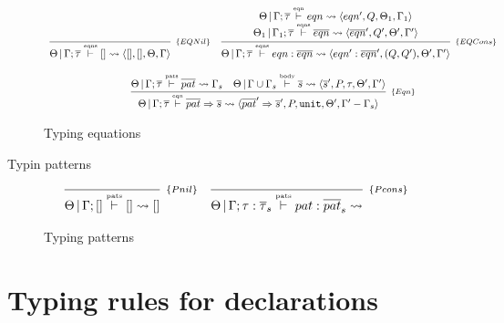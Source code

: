 \documentclass[a4paper, 11pt]{article}
\begin{document}
\begin{figure}[H]
  \[
    \begin{array}{cc}
      \infer[_{\{EQNil\}}]
      {\Theta \,|\, \Gamma ; \overline{\tau} \typing{eqns} [] \leadsto \langle [], [], \Theta, \Gamma \rangle}
            {}
      &
      \infer[_{\{EQCons\}}]
      {\Theta\,|\,\Gamma ; \overline{\tau}\typing{eqns} eqn : \overline{eqn} \leadsto \langle eqn' : \overline{eqn}', (Q, Q'), \Theta', \Gamma' \rangle}
            {\begin{array}{c}
                \Theta\,|\,\Gamma ; \overline{\tau}\typing{eqn} eqn \leadsto \langle eqn', Q, \Theta_1, \Gamma_1 \rangle \\ 
                \Theta_1\,|\,\Gamma_1; \overline{\tau} \typing{eqns} \overline{eqn} \leadsto \langle \overline{eqn}', Q', \Theta', \Gamma' \rangle 
             \end{array}} \\ \\ 
      \multicolumn{2}{c}{
        \infer[_{\{Eqn\}}]
              {\Theta\,|\,\Gamma ; \overline{\tau}\typing{eqn} \overline{pat} \Rightarrow \overline{s} \leadsto \langle \overline{pat}' \Rightarrow \overline{s}', P, \unit, \Theta', \Gamma' - \Gamma_s\rangle}
              {\Theta\,|\,\Gamma;\overline{\tau}\typing{pats} \overline{pat} \leadsto \Gamma_s
               & 
               \Theta\,|\,\Gamma \cup \Gamma_s \typing{body} \overline{s} \leadsto \langle \overline{s}', P, \tau, \Theta', \Gamma' \rangle 
              }
      }    
    \end{array}
  \]
  \centering 
  \caption{Typing equations}
  \label{fig:equations}
\end{figure}

Typin patterns 

\begin{figure}[H]
  \[
    \begin{array}{cc}
      \infer[_{\{Pnil\}}]
            {\Theta\,|\,\Gamma ; [] \typing{pats} [] \leadsto []}
            {}
      & 
      \infer[_{\{Pcons\}}]
            {\Theta\,|\,\Gamma ; \tau : \overline{\tau}_s \typing{pats} pat : \overline{pat}_s \leadsto  }
            {}
    \end{array}
  \]
  \centering
  \caption{Typing patterns}
  \label{fig:patterns}
\end{figure}

\section{Typing rules for declarations}
\end{document}
